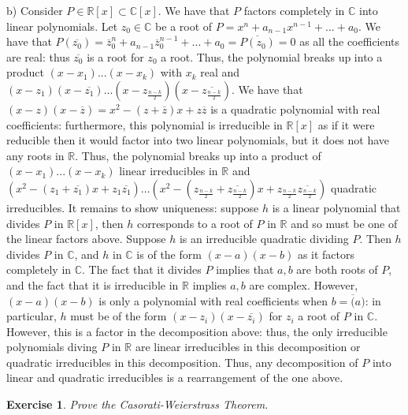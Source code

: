 \documentclass{article}
\newcommand{\bb}[1]{\mathbb{#1}}
\newcommand{\conj}{\overline}
\newtheorem{exercise}{Exercise}
\begin{document}
b) Consider $P  \in \bb{R}[x] \subset \bb{C}[x]$. We have that $P$ factors completely in $\bb{C}$ into linear polynomials. Let $z_{0} \in \bb{C}$ be a root of $P = x^{n} + a_{n-1}x^{n-1} + ... + a_{0}$. We have that $P(\conj{z_{0}}) = \conj{z}_{0}^{n} + a_{n-1}\conj{z}_{0}^{n-1} + ...  + a_{0} = \overline{P(z_{0})} = 0$ as all the coefficients are real: thus $\conj{z_{0}}$ is a root for $z_{0}$ a root. Thus, the polynomial breaks up into a product $(x-x_{1})...(x-x_{k})$ with $x_{k}$ real and $(x-z_{1})(x-\conj{z_{1}})...(x-z_{\frac{n-k}{2}})(x-\conj{z_{\frac{n-k}{2}}})$. We have that $(x-z)(x-\conj{z}) = x^{2} - (z + \conj{z})x + z\conj{z}$ is a quadratic polynomial with real coefficients: furthermore, this polynomial is irreducible in $\bb{R}[x]$ as if it were reducible then it would factor into two linear polynomials, but it does not have any roots in $\bb{R}$. Thus, the polynomial breaks up into a product of $(x-x_{1})...(x-x_{k})$ linear irreducibles in $\bb{R}$ and $(x^{2} - (z_{1} + \conj{z_{1}})x + z_{1}\conj{z_{1}})...(x^{2} - (z_{\frac{n-k}{2}} + \conj{z_{\frac{n-k}{2}}})x + z_{\frac{n-k}{2}}\conj{z_{\frac{n-k}{2}}})$ quadratic irreducibles. It remains to show uniqueness: suppose $h$ is a linear polynomial that divides $P$ in $\bb{R}[x]$, then $h$ corresponds to a root of $P$ in $\bb{R}$ and so must be one of the linear factors above. Suppose $h$ is an irreducible quadratic dividing $P$. Then $h$ divides $P$ in $\bb{C}$, and $h$ in $\bb{C}$ is of the form $(x-a)(x-b)$ as it factors completely in $\bb{C}$. The fact that it divides $P$ implies that $a, b$ are both roots of $P$, and the fact that it is irreducible in $\bb{R}$ implies $a, b$ are complex. However, $(x-a)(x-b)$ is only a polynomial with real coefficients when $b = \conj(a)$: in particular, $h$ must be of the form $(x-z_{i})(x-\conj{z_{i}})$ for $z_{i}$ a root of $P$ in $\bb{C}$. However, this is a factor in the decomposition above: thus, the only irreducible polynomials diving $P$ in $\bb{R}$ are linear irreducibles in this decomposition or quadratic irreducibles in this decomposition. Thus, any decomposition of $P$ into linear and quadratic irreducibles is a rearrangement of the one above. 
\begin{exercise}
  Prove the Casorati-Weierstrass Theorem.
\end{exercise}
\end{document}

